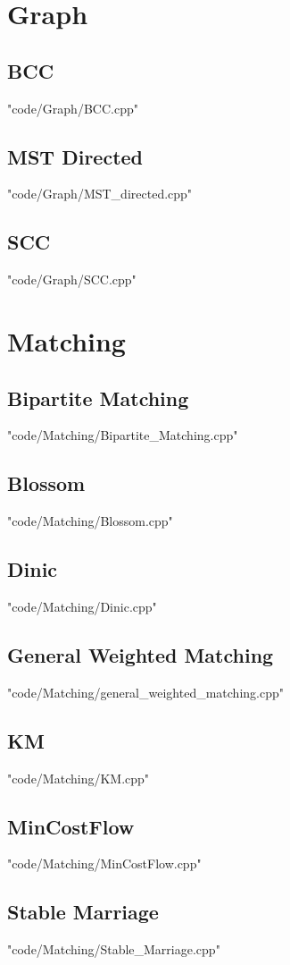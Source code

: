 \documentclass [landscape,8pt,a4paper,twocolumn]{article}
\begin{document}
\section{Graph}
\subsection{BCC}
 {"code/Graph/BCC.cpp"}
\subsection{MST Directed}
 {"code/Graph/MST_directed.cpp"}
\subsection{SCC}
 {"code/Graph/SCC.cpp"}
\section{Matching}
\subsection{Bipartite Matching}
 {"code/Matching/Bipartite_Matching.cpp"}
\subsection{Blossom}
 {"code/Matching/Blossom.cpp"}
\subsection{Dinic}
 {"code/Matching/Dinic.cpp"}
\subsection{General Weighted Matching}
 {"code/Matching/general_weighted_matching.cpp"}
\subsection{KM}
 {"code/Matching/KM.cpp"}
\subsection{MinCostFlow}
 {"code/Matching/MinCostFlow.cpp"}
\subsection{Stable Marriage}
 {"code/Matching/Stable_Marriage.cpp"}
\end{document}
